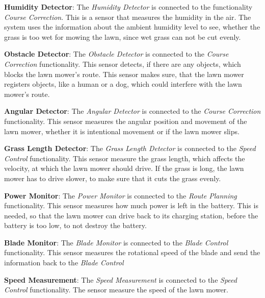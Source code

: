 \textbf{Humidity Detector}:
The \textit{Humidity Detector} is connected to the functionality \textit{Course Correction}. This is a sensor that measures the humidity in the air. The system uses the information about the ambient humidity level to see, whether the grass is too wet for mowing the lawn, since wet grass can not be cut evenly. 

\textbf{Obstacle Detector}:
The \textit{Obstacle Detector} is connected to the \textit{Course Correction} functionality. This sensor detects, if there are any objects, which blocks the lawn mower's route. This sensor makes sure, that the lawn mower registers objects, like a human or a dog, which could interfere with the lawn mower's route.

\textbf{Angular Detector}:
The \textit{Angular Detector} is connected to the \textit{Course Correction} functionality. This sensor measures the angular position and movement of the lawn mower, whether it is intentional movement or if the lawn mower slips.

\textbf{Grass Length Detector}:
The \textit{Grass Length Detector} is connected to the \textit{Speed Control} functionality. This sensor measure the  grass length, which affects the velocity, at which the lawn mower should drive. If the grass is long, the lawn mower has to drive slower, to make sure that it cuts the grass evenly. 

\textbf{Power Monitor}:
The \textit{Power Monitor} is connected to the \textit{Route Planning} functionality. This sensor measures how much power is left in the battery. This is needed, so that the lawn mower can drive back to its charging station, before the battery is too low, to not destroy the battery.

\textbf{Blade Monitor}:
The \textit{Blade Monitor} is connected to the \textit{Blade Control} functionality. This sensor measures the rotational speed of the blade and send the information back to the \textit{Blade Control}

\textbf{Speed Measurement}:
The \textit{Speed Measurement} is connected to the \textit{Speed Control} functionality. The sensor measure the speed of the lawn mower.